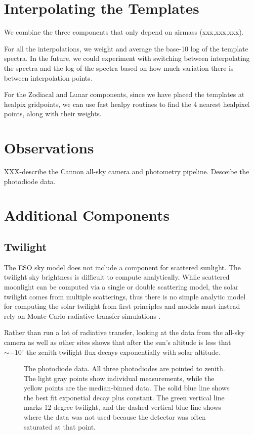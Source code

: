 \documentclass{emulateapj}  %
\newcommand\degree{{^\circ}}
\begin{document}
{\section{Interpolating the Templates}

We combine the three components that only depend on airmass (xxx,xxx,xxx).

For all the interpolations, we weight and average the base-10 log of the template spectra.  In the future, we could experiment with switching between interpolating the spectra and the log of the spectra based on how much variation there is between interpolation points.

For the Zodiacal and Lunar components, since we have placed the templates at healpix gridpoints, we can use fast healpy routines to find the 4 nearest healpixel points, along with their weights.  


\section{Observations}

XXX-describe the Cannon all-sky camera and photometry pipeline. Desceibe the photodiode data.  


\section{Additional Components}
\subsection{Twilight}

The ESO sky model does not include a component for scattered sunlight.  The twilight sky brightness is difficult to compute analytically.  While scattered moonlight can be computed via a single or double scattering model, the solar twilight comes from multiple scatterings, thus there is no simple analytic model for computing the solar twilight from first principles and models must instead rely on Monte Carlo radiative transfer simulations \citep{Patat06}.

Rather than run a lot of radiative transfer, looking at the data from the all-sky camera as well as other sites shows that after the sun's altitude is less that $\sim-10\degree$ the zenith twilight flux decays exponentially with solar altitude.

\begin{figure*}
  \caption{The photodiode data.  All three photodiodes are pointed to zenith. The light gray points show individual measurements, while the yellow points are the median-binned data. The solid blue line shows the best fit exponetial decay plus constant. The green vertical line marks 12 degree twilight, and the dashed vertical blue line shows where the data was not used because the detector was often saturated at that point. \label{diodePlot}}
\end{figure*}


}
\end{document}

